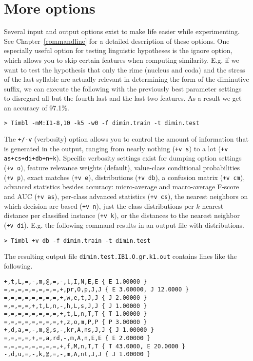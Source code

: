\documentclass{report}
\begin{document}
\section{More options}

Several input and output options exist to make life easier while
experimenting. See Chapter~\ref{commandline} for a detailed
description of these options. One especially useful option for testing
linguistic hypotheses is the ignore option, which allows you to skip
certain features when computing similarity. E.g. if we want to test
the hypothesis that only the rime (nucleus and coda) and the stress of
the last syllable are actually relevant in determining the form of the
diminutive suffix, we can execute the following with the previously
best parameter settings to disregard all but the fourth-last and the
last two features. As a result we get an accuracy of
97.1\%.

{\footnotesize
\begin{verbatim}
> Timbl -mM:I1-8,10 -k5 -w0 -f dimin.train -t dimin.test
\end{verbatim}
}

The {\tt +/-v} (verbosity) option allows you to control the amount of
information that is generated in the output, ranging from nearly nothing
({\tt +v s}) to a lot ({\tt +v as+cs+di+db+n+k}). Specific
verbosity settings exist for dumping option settings ({\tt +v o}),
feature relevance weights (default), value-class conditional
probabilities ({\tt +v p}), exact matches ({\tt +v e}), distributions
({\tt +v db}), a confusion matrix ({\tt +v cm}), advanced statistics
besides accuracy: micro-average and macro-average F-score and AUC
({\tt +v as}), per-class advanced statistics ({\tt +v cs}), the
nearest neighbors on which decision are based ({\tt +v n}), just the
class distributions per $k$-nearest distance per classified instance
({\tt +v k}), or the distances to the nearest neighbor ({\tt +v
  di}). E.g. the following command results in an output file with
distributions.

{\footnotesize
\begin{verbatim}
> Timbl +v db -f dimin.train -t dimin.test
\end{verbatim}
}

The resulting output file {\tt dimin.test.IB1.O.gr.k1.out} contains
lines like the following.

{\footnotesize
\begin{verbatim}
+,t,L,=,-,m,@,=,-,l,I,N,E,E { E 1.00000 }
=,=,=,=,=,=,=,=,+,pr,O,p,J,J { E 3.00000, J 12.0000 }
=,=,=,=,=,=,=,=,+,w,e,t,J,J { J 2.00000 }
=,=,=,=,+,t,L,n,-,h,L,s,J,J { J 1.00000 }
=,=,=,=,=,=,=,=,+,t,L,n,T,T { T 1.00000 }
=,=,=,=,=,=,=,=,+,z,o,m,P,P { P 3.00000 }
+,d,a,=,-,m,@,s,-,kr,A,ns,J,J { J 1.00000 }
=,=,=,=,+,=,a,rd,-,m,A,n,E,E { E 2.00000 }
=,=,=,=,=,=,=,=,+,f,M,n,T,T { T 43.0000, E 20.0000 }
-,d,u,=,-,k,@,=,-,m,A,nt,J,J { J 1.00000 }
\end{verbatim}
}
\end{document}
